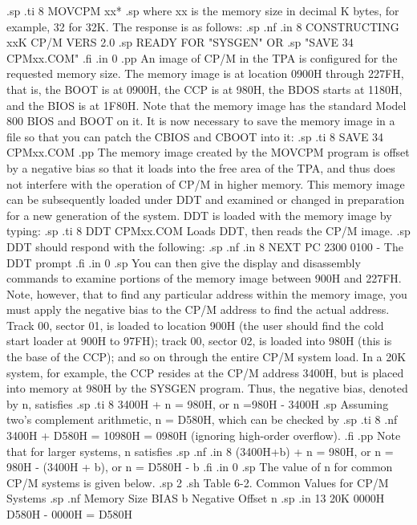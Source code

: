 .sp
.ti 8
MOVCPM xx*
.sp
where xx is the memory size in decimal K bytes, for example, 32 
for 32K.  The response is as follows:
.sp
.nf
.in 8
CONSTRUCTING xxK CP/M VERS 2.0
.sp
READY FOR "SYSGEN" OR
.sp
"SAVE 34 CPMxx.COM"
.fi
.in 0
.pp
An image of CP/M in the TPA is configured for the requested 
memory size.  The memory image is at location 0900H through 
227FH, that is, the BOOT is at 0900H, the CCP is at 980H, the 
BDOS starts at 1180H, and the BIOS is at 1F80H.  Note that the 
memory image has the standard Model 800 BIOS and BOOT on it.  It is now 
necessary to save the memory image in a file so that you can 
patch the CBIOS and CBOOT into it:
.sp
.ti 8
SAVE 34 CPMxx.COM
.pp
The memory image created by the MOVCPM program is offset by a 
negative bias so that it loads into the free area of the TPA, and 
thus does not interfere with the operation of CP/M in higher 
memory.  This memory image can be subsequently loaded under DDT 
and examined or changed in preparation for a new generation of 
the system.  DDT is loaded with the memory image by typing:
.sp
.ti 8
DDT CPMxx.COM       Loads DDT, then reads the CP/M image.
.sp
DDT should respond with the following:
.sp
.nf
.in 8
NEXT PC
2300 0100
-                                          The DDT prompt 
.fi
.in 0
.sp
You can then give the display and disassembly commands to examine 
portions of the memory image between 900H and 227FH.  
Note, however, that to find any particular address 
within the memory image, you must apply the negative bias to the 
CP/M address to find the actual address.  Track 00, sector 01, is 
loaded to location 900H (the user should find the cold start 
loader at 900H to 97FH); track 00, sector 02, is loaded into 980H 
(this is the base of the CCP); and so on through the entire CP/M 
system load.  In a 20K system, for example, the CCP resides at 
the CP/M address 3400H, but is placed into memory at 980H by the 
SYSGEN program.  Thus, the negative bias, denoted by n, satisfies
.sp
.ti 8
3400H + n = 980H, or n =980H - 3400H
.sp
Assuming two's complement arithmetic, n = D580H, which can be 
checked by
.sp
.ti 8
.nf
3400H + D580H = 10980H = 0980H (ignoring high-order 
                                       overflow).
.fi
.pp
Note that for larger systems, n satisfies
.sp
.nf
.in 8
(3400H+b) + n = 980H, or
n = 980H - (3400H + b), or
n = D580H - b
.fi
.in 0
.sp
The value of n for common CP/M systems is given below.
.sp 2
.sh
           Table 6-2.  Common Values for CP/M Systems
.sp
.nf
         Memory Size      BIAS b      Negative Offset n
.sp
.in 13
20K          0000H     D580H - 0000H = D580H
